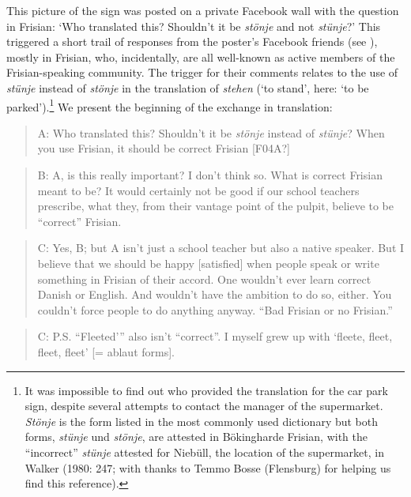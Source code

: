 \documentclass[output=paper]{langsci/langscibook}
\begin{document}
This picture of the sign was posted on a private Facebook wall with the question in Frisian: ‘Who translated this? Shouldn’t it be \textit{stönje} and not \textit{stünje}?’ This triggered a short trail of responses from the poster’s Facebook friends (see ), mostly in Frisian, who, incidentally, are all well-known as active members of the Frisian-speaking community. The trigger for their comments relates to the use of \textit{stünje} instead of \textit{stönje} in the translation of \textit{stehen} (‘to stand’, here: ‘to be parked’).\footnote{It was impossible to find out who provided the translation for the car park sign, despite several attempts to contact the manager of the supermarket. \textit{Stönje} is the form listed in the most commonly used dictionary but both forms, \textit{stünje} und \textit{stönje}, are attested in Bökingharde Frisian, with the “incorrect” \textit{stünje} attested for Niebüll, the location of the supermarket, in Walker (1980: 247; with thanks to Temmo Bosse (Flensburg) for helping us find this reference).} We present the beginning of the exchange in translation:

\begin{quote}
A: Who translated this? Shouldn’t it be \textit{stönje} instead of \textit{stünje}? When you use Frisian, it should be correct Frisian [F04A?]
\end{quote}

\begin{quote}
B: A, is this really important? I don’t think so. What is correct Frisian meant to be? It would certainly not be good if our school teachers prescribe, what they, from their vantage point of the pulpit, believe to be “correct” Frisian.   
 
\end{quote}

\begin{quote}
C: Yes, B; but A isn’t just a school teacher but also a native speaker. But I believe that we should be happy [satisfied] when people speak or write something in Frisian of their accord. One wouldn’t ever learn correct Danish or English. And wouldn’t have the ambition to do so, either. You couldn’t force people to do anything anyway. “Bad Frisian or no Frisian.”
\end{quote}

\begin{quote}
C: P.S. “Fleeted’” also isn’t “correct”. I myself grew up with ‘fleete, fleet, fleet, fleet’ [= ablaut forms]. 
\end{quote}
\end{document}
